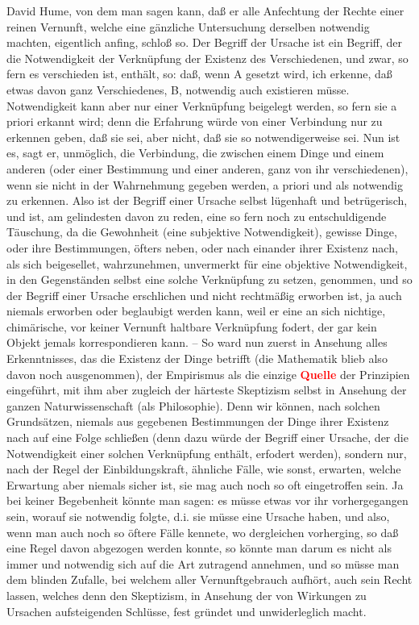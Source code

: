 \documentclass[a4paper,12pt,twoside]{book}
\newcommand{\match}[1]{\textcolor{red}{\textbf{#1}}}
\begin{document}
	David Hume, von dem man sagen kann, daß er alle Anfechtung der Rechte einer reinen Vernunft, welche eine gänzliche Untersuchung derselben notwendig machten, eigentlich anfing, schloß so. Der Begriff der Ursache ist ein Begriff, der die Notwendigkeit der Verknüpfung der Existenz des Verschiedenen, und zwar, so fern es verschieden ist, enthält, so: daß, wenn A gesetzt wird, ich erkenne, daß etwas davon ganz Verschiedenes, B, notwendig auch existieren müsse. Notwendigkeit kann aber nur einer Verknüpfung beigelegt werden, so fern sie a priori erkannt wird; denn die Erfahrung würde von einer Verbindung nur zu erkennen geben, daß sie sei, aber nicht, daß sie so notwendigerweise sei. Nun ist es, sagt er, unmöglich, die Verbindung, die zwischen einem Dinge und einem anderen (oder einer Bestimmung und einer anderen, ganz von ihr verschiedenen), wenn sie nicht in der Wahrnehmung gegeben werden, a priori und als notwendig zu erkennen. Also ist der Begriff einer Ursache selbst lügenhaft und betrügerisch, und ist, am gelindesten davon zu reden, eine so fern noch zu entschuldigende Täuschung, da die Gewohnheit (eine subjektive Notwendigkeit), gewisse Dinge, oder ihre Bestimmungen, öfters neben, oder nach einander ihrer Existenz nach, als sich beigesellet, wahrzunehmen, unvermerkt für eine objektive Notwendigkeit, in den Gegenständen selbst eine solche Verknüpfung zu setzen, genommen, und so der Begriff einer Ursache erschlichen und nicht rechtmäßig erworben ist, ja auch niemals erworben oder beglaubigt werden kann, weil er eine an sich nichtige, chimärische, vor keiner Vernunft haltbare Verknüpfung fodert, der gar kein Objekt jemals korrespondieren kann. – So ward nun zuerst in Ansehung alles Erkenntnisses, das die Existenz der Dinge betrifft (die Mathematik blieb also davon noch ausgenommen), der Empirismus als die einzige \match{Quelle} der Prinzipien eingeführt, mit ihm aber zugleich der härteste Skeptizism selbst in Ansehung der ganzen Naturwissenschaft (als Philosophie). Denn wir können, nach solchen Grundsätzen, niemals aus gegebenen Bestimmungen der Dinge ihrer Existenz nach auf eine Folge schließen (denn dazu würde der Begriff einer Ursache, der die Notwendigkeit einer solchen Verknüpfung enthält, erfodert werden), sondern nur, nach der Regel der Einbildungskraft, ähnliche Fälle, wie sonst, erwarten, welche Erwartung aber niemals sicher ist, sie mag auch noch so oft eingetroffen sein. Ja bei keiner Begebenheit könnte man sagen: es müsse etwas vor ihr vorhergegangen sein, worauf sie notwendig folgte, d.i. sie müsse eine Ursache haben, und also, wenn man auch noch so öftere Fälle kennete, wo dergleichen vorherging, so daß eine Regel davon abgezogen werden konnte, so könnte man darum es nicht als immer und notwendig sich auf die Art zutragend annehmen, und so müsse man dem blinden Zufalle, bei welchem aller Vernunftgebrauch aufhört, auch sein Recht lassen, welches denn den Skeptizism, in Ansehung der von Wirkungen zu Ursachen aufsteigenden Schlüsse, fest gründet und unwiderleglich macht. 
	
\end{document}
